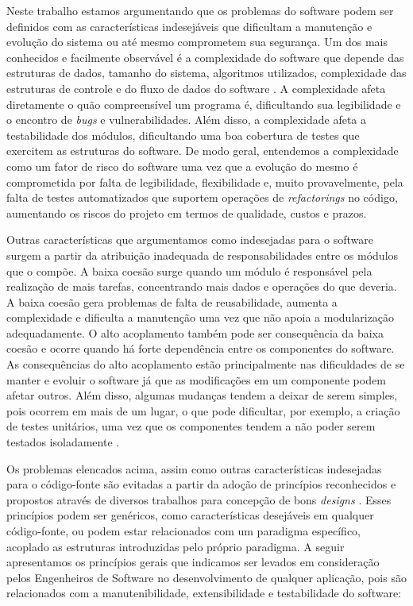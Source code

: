 %

Neste trabalho estamos argumentando que os problemas do software podem ser definidos com as características indesejáveis que dificultam a manutenção e evolução do sistema ou até mesmo comprometem sua segurança.
%
Um dos mais conhecidos e facilmente observável é a complexidade do software que depende das estruturas de dados, tamanho do sistema, algoritmos utilizados, complexidade das estruturas de controle e do fluxo de dados do software \cite{basili1983}.
%
A complexidade afeta diretamente o quão compreensível um programa é, dificultando sua legibilidade e o encontro de \emph{bugs} e vulnerabilidades.
%
Além disso, a complexidade afeta a testabilidade dos módulos, dificultando uma boa cobertura de testes que exercitem as estruturas do software.
%
De modo geral, entendemos a complexidade como um fator de risco do software uma vez que a evolução do mesmo é comprometida por falta de legibilidade, flexibilidade e, muito provavelmente, pela falta de testes automatizados que suportem operações de \emph{refactorings} no código, aumentando os riscos do projeto em termos de qualidade, custos e prazos.


Outras características que argumentamos como indesejadas para o software surgem a partir da atribuição inadequada de responsabilidades entre os módulos que o compõe.
%
A baixa coesão surge quando um módulo é responsável pela realização de mais tarefas, concentrando mais dados e operações do que deveria. A baixa coesão gera problemas de falta de reusabilidade, aumenta a complexidade e dificulta a manutenção uma vez que não apoia a modularização adequadamente.
%
O alto acoplamento também pode ser consequência da baixa coesão e ocorre quando há forte dependência entre os componentes do software.
%
As consequências do alto acoplamento estão principalmente nas dificuldades de se manter e evoluir o software já que as modificações em um componente podem afetar outros.
%
Além disso, algumas mudanças tendem a deixar de serem simples, pois ocorrem em mais de um lugar, o que pode dificultar, por exemplo, a criação de testes unitários, uma vez que os componentes tendem a não poder serem testados isoladamente \cite{martensson2005}.


Os problemas elencados acima, assim como outras características indesejadas para o código-fonte são evitadas a partir da adoção de princípios reconhecidos e propostos através de diversos trabalhos para concepção de bons \emph{designs} \cite{martin2002} \cite{lakos1996} \cite{demeyer2002} \cite{lieberherr1996}.
%
Esses princípios podem ser genéricos, como características desejáveis em qualquer código-fonte, ou podem estar relacionados com um paradigma específico, acoplado as estruturas introduzidas pelo próprio paradigma.
%
A seguir apresentamos os princípios gerais que indicamos ser levados em consideração pelos Engenheiros de Software no desenvolvimento de qualquer aplicação, pois são relacionados com a manutenibilidade, extensibilidade e testabilidade do software:

